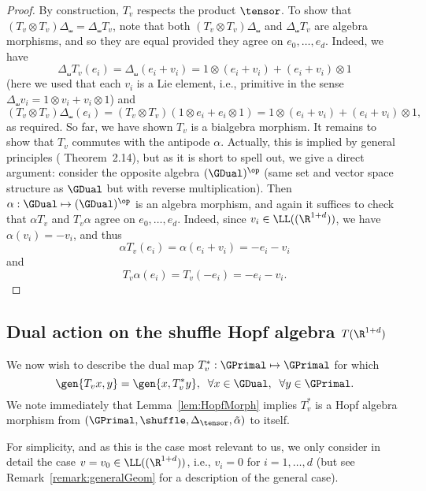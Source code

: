 \documentclass{article}
\begin{document}
\begin{proof}
By construction, $T_v$ respects the product $\tensor$. To show that $(T_v \otimes T_v) \Delta_\shuffle = \Delta_\shuffle T_v$, note that both $(T_v \otimes T_v) \Delta_\shuffle$ and $\Delta_\shuffle T_v$ are algebra morphisms, and so they are equal provided they agree on $e_0,\ldots, e_d$. Indeed, we have
\[
\Delta_\shuffle T_v (e_i) = \Delta_\shuffle (e_i + v_i) = 1 \otimes (e_i + v_i) + (e_i + v_i) \otimes 1
\]
(here we used that each $v_i$ is a Lie element, i.e., primitive in the sense $\Delta_\shuffle v_i = 1 \otimes v_i + v_i \otimes 1$) and
\[
(T_v \otimes T_v) \Delta_\shuffle (e_i) = (T_v\otimes T_v) (1\otimes e_i + e_i\otimes 1) = 1 \otimes (e_i + v_i) + (e_i + v_i) \otimes 1,
\]
as required. So far, we have shown $T_v$ is a bialgebra morphism. It remains to show that $T_v$ commutes with the antipode $\alpha$. Actually, this is implied by general principles (\cite{Preiss16} Theorem~2.14), but as it is short to spell out, we give a direct argument: consider the opposite algebra $(\GDual)^{\op}$ (same set and vector space structure as $\GDual$ but with reverse multiplication). Then $\alpha : \GDual \mapsto (\GDual)^{\op}$ is an algebra morphism, and again it suffices to check that $\alpha T_v$ and $T_v \alpha$ agree on $e_0,\ldots, e_d$. Indeed, since $v_i \in \LL((\R^{1+d}))$, we have $\alpha(v_i) = -v_i$, and thus
\[
\alpha T_v(e_i) = \alpha(e_i + v_i) = -e_i - v_i
\] 
and
\[
T_v \alpha(e_i) = T_v(-e_i) = -e_i - v_i.
\]
\end{proof}


\subsection{Dual action on the shuffle Hopf algebra $T(\R^{1+d})$}  \label{subsec:DualMapGeom}


We now wish to describe the dual map $T_v^* : \GPrimal \mapsto \GPrimal$ for which
\[
\gen{T_v x, y} = \gen{x, T_v^* y}, \; \; \forall x \in \GDual, \; \; \forall y \in \GPrimal.
\]
We note immediately that Lemma~\ref{lem:HopfMorph} implies $T^*_v$ is a Hopf algebra morphism from $(\GPrimal, \shuffle, \Delta_\tensor, \tilde \alpha)$ to itself.


For simplicity, and as this is the case most relevant to us, we only consider in detail the case $v = v_0 \in \LL((\R^{1+d}))$, i.e., $v_i = 0$ for $i = 1,\ldots, d$ (but see Remark~\ref{remark:generalGeom} for a description of the general case).
\end{document}

